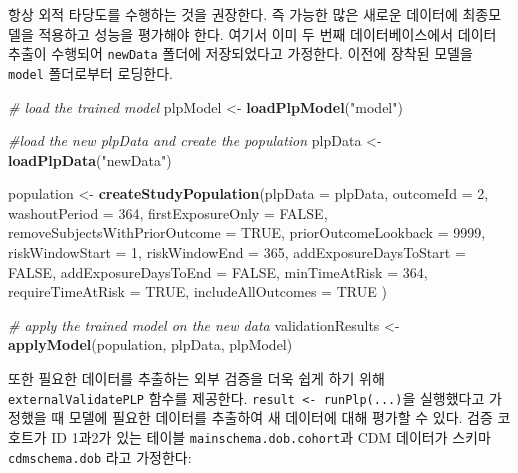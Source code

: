 \documentclass[10.5pt]{book}
\newenvironment{Shaded}{\begin{snugshade}}{\end{snugshade}}
\newcommand{\KeywordTok}[1]{\textcolor[rgb]{0.13,0.29,0.53}{\textbf{#1}}}
\newcommand{\DataTypeTok}[1]{\textcolor[rgb]{0.13,0.29,0.53}{#1}}
\newcommand{\DecValTok}[1]{\textcolor[rgb]{0.00,0.00,0.81}{#1}}
\newcommand{\StringTok}[1]{\textcolor[rgb]{0.31,0.60,0.02}{#1}}
\newcommand{\CommentTok}[1]{\textcolor[rgb]{0.56,0.35,0.01}{\textit{#1}}}
\newcommand{\OtherTok}[1]{\textcolor[rgb]{0.56,0.35,0.01}{#1}}
\newcommand{\NormalTok}[1]{#1}
\theoremstyle{definition}
\theoremstyle{definition}
\theoremstyle{definition}
\theoremstyle{remark}
\begin{document}
항상 외적 타당도를 수행하는 것을 권장한다. 즉 가능한 많은 새로운
데이터에 최종모델을 적용하고 성능을 평가해야 한다. 여기서 이미 두 번째
데이터베이스에서 데이터 추출이 수행되어 \texttt{newData} 폴더에
저장되었다고 가정한다. 이전에 장착된 모델을 \texttt{model} 폴더로부터
로딩한다.

\begin{Shaded}
\begin{Highlighting}[]
\CommentTok{# load the trained model}
\NormalTok{plpModel <-}\StringTok{ }\KeywordTok{loadPlpModel}\NormalTok{(}\StringTok{"model"}\NormalTok{)}

\CommentTok{#load the new plpData and create the population}
\NormalTok{plpData <-}\StringTok{ }\KeywordTok{loadPlpData}\NormalTok{(}\StringTok{"newData"}\NormalTok{)}

\NormalTok{population <-}\StringTok{ }\KeywordTok{createStudyPopulation}\NormalTok{(}\DataTypeTok{plpData =}\NormalTok{ plpData,}
                                    \DataTypeTok{outcomeId =} \DecValTok{2}\NormalTok{,}
                                    \DataTypeTok{washoutPeriod =} \DecValTok{364}\NormalTok{,}
                                    \DataTypeTok{firstExposureOnly =} \OtherTok{FALSE}\NormalTok{,}
                                    \DataTypeTok{removeSubjectsWithPriorOutcome =} \OtherTok{TRUE}\NormalTok{,}
                                    \DataTypeTok{priorOutcomeLookback =} \DecValTok{9999}\NormalTok{,}
                                    \DataTypeTok{riskWindowStart =} \DecValTok{1}\NormalTok{,}
                                    \DataTypeTok{riskWindowEnd =} \DecValTok{365}\NormalTok{,}
                                    \DataTypeTok{addExposureDaysToStart =} \OtherTok{FALSE}\NormalTok{,}
                                    \DataTypeTok{addExposureDaysToEnd =} \OtherTok{FALSE}\NormalTok{,}
                                    \DataTypeTok{minTimeAtRisk =} \DecValTok{364}\NormalTok{,}
                                    \DataTypeTok{requireTimeAtRisk =} \OtherTok{TRUE}\NormalTok{,}
                                    \DataTypeTok{includeAllOutcomes =} \OtherTok{TRUE}
\NormalTok{)}

\CommentTok{# apply the trained model on the new data}
\NormalTok{validationResults <-}\StringTok{ }\KeywordTok{applyModel}\NormalTok{(population, plpData, plpModel)}
\end{Highlighting}
\end{Shaded}

또한 필요한 데이터를 추출하는 외부 검증을 더욱 쉽게 하기 위해
\texttt{externalValidatePLP} 함수를 제공한다.
\texttt{result\ \textless{}-\ runPlp(...)}을 실행했다고 가정했을 때
모델에 필요한 데이터를 추출하여 새 데이터에 대해 평가할 수 있다. 검증
코호트가 ID 1과2가 있는 테이블 \texttt{mainschema.dob.cohort}과 CDM
데이터가 스키마 \texttt{cdmschema.dob} 라고 가정한다:
\end{document}
